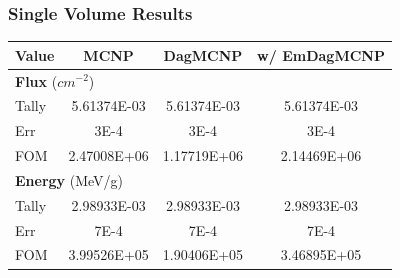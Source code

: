 \documentclass[12pt]{beamer}
\begin{document}
\begin{frame}
\frametitle{Single Volume Results}

\begin{table}[h]

  \begin{center}

    \begin{tabular}{lccc}
     \toprule
      Value & MCNP & DagMCNP & w/ EmDagMCNP \\
     \toprule
     \multicolumn{4}{l}{\textbf{Flux} ($cm^{-2}$)} \\
     \hline
     Tally & 5.61374E-03 & 5.61374E-03 & 5.61374E-03 \\
     Err & 3E-4 & 3E-4 & 3E-4  \\
     FOM & 2.47008E+06 & 1.17719E+06 & 2.14469E+06 \\
     \hline
     \multicolumn{4}{l}{\textbf{Energy} (MeV/g)} \\
     \hline
     Tally & 2.98933E-03 & 2.98933E-03 & 2.98933E-03 \\
     Err & 7E-4 & 7E-4 & 7E-4 \\
     FOM & 3.99526E+05 & 1.90406E+05 & 3.46895E+05 \\
     \bottomrule
     
    \end{tabular}


  \end{center}
\vspace{-0.4cm}
\end{table}

\end{frame}



\begin{frame}
  
  
\end{frame}
\end{document}
